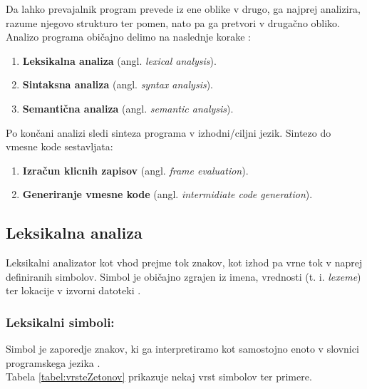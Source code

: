 \documentclass[a4paper, 12p]{book}
\begin{document}
Da lahko prevajalnik program prevede iz ene oblike v drugo, ga najprej analizira, razume njegovo strukturo ter pomen, nato pa ga pretvori v drugačno obliko.  \\
Analizo programa običajno delimo na naslednje korake \cite{modernCompiler}:
\begin{enumerate}
	\item \textbf{Leksikalna analiza} (angl. \textit{lexical analysis}).
	\item \textbf{Sintaksna analiza} (angl. \textit{syntax analysis}).
	\item \textbf{Semantična analiza} (angl. \textit{semantic analysis}).
\end{enumerate}

Po končani analizi sledi sinteza programa v izhodni/ciljni jezik. Sintezo do vmesne kode sestavljata:
\begin{enumerate}
	\item \textbf{Izračun klicnih zapisov} (angl. \textit{frame evaluation}).
	\item \textbf{Generiranje vmesne kode} (angl. \textit{intermidiate code generation}).
\end{enumerate}

\subsection{Leksikalna analiza}

Leksikalni analizator kot vhod prejme tok znakov, kot izhod pa vrne tok v naprej definiranih simbolov. Simbol je običajno zgrajen iz imena, vrednosti (t. i. \textit{lexeme}) ter lokacije v izvorni datoteki \cite{modernCompiler}.

\subsubsection{Leksikalni simboli:}

Simbol je zaporedje znakov, ki ga interpretiramo kot samostojno enoto v slovnici programskega jezika \cite{modernCompiler}. \\ 
Tabela \ref{tabel:vrsteZetonov} prikazuje nekaj vrst simbolov ter primere. \\
\end{document}
